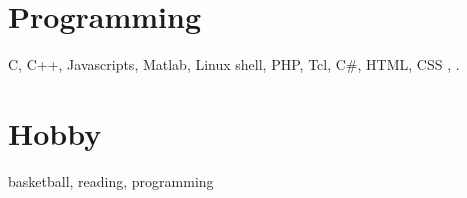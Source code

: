 \documentclass[margin,line]{cv}
\begin{document}
\begin{resume}

	\section{\mysidestyle Programming}

	C, C++, Javascripts, Matlab, Linux shell, PHP, Tcl, C\#, HTML, CSS , \LaTeXe.

	\section{\mysidestyle Hobby}

	basketball, reading, programming
\end{resume}
\end{document}
